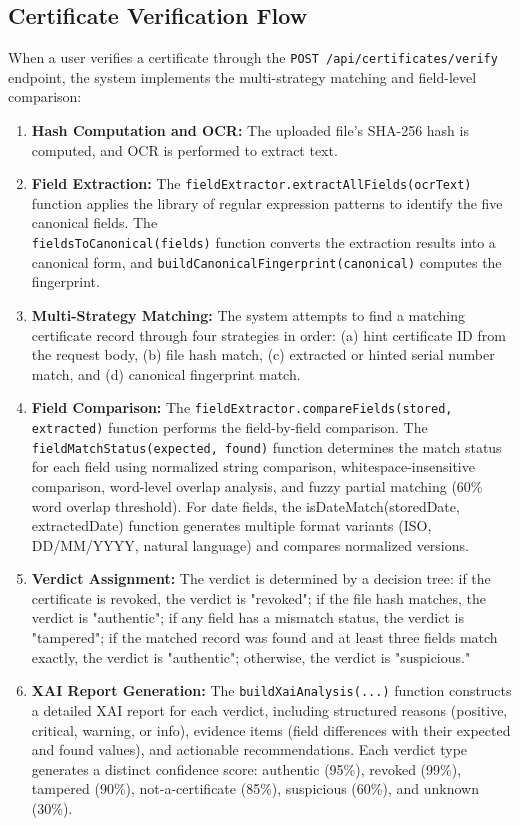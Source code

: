 \subsection{Certificate Verification Flow}

When a user verifies a certificate through the \texttt{POST /api/certificates/verify} endpoint, the system implements the multi-strategy matching and field-level comparison:

\begin{enumerate}
    \item \textbf{Hash Computation and OCR:} The uploaded file's SHA-256 hash is computed, and OCR is performed to extract text.
    \item \textbf{Field Extraction:} The \texttt{fieldExtractor.extractAllFields(ocrText)} function applies the library of regular expression patterns to identify the five canonical fields. The \\\texttt{fieldsToCanonical(fields)} function converts the extraction results into a canonical form, and \texttt{buildCanonicalFingerprint(canonical)} computes the fingerprint.
    \item \textbf{Multi-Strategy Matching:} The system attempts to find a matching certificate record through four strategies in order: (a) hint certificate ID from the request body, (b) file hash match, (c) extracted or hinted serial number match, and (d) canonical fingerprint match.
    \item \textbf{Field Comparison:} The \texttt{fieldExtractor.compareFields(stored, extracted)} function performs the field-by-field comparison. The \texttt{fieldMatchStatus(expected, found)} function determines the match status for each field using normalized string comparison, whitespace-insensitive comparison, word-level overlap analysis, and fuzzy partial matching (60\% word overlap threshold). For date fields, the {isDateMatch(storedDate, extractedDate)} function generates multiple format variants (ISO, DD/MM/YYYY, natural language) and compares normalized versions.
    \item \textbf{Verdict Assignment:} The verdict is determined by a decision tree: if the certificate is revoked, the verdict is "revoked"; if the file hash matches, the verdict is "authentic"; if any field has a mismatch status, the verdict is "tampered"; if the matched record was found and at least three fields match exactly, the verdict is "authentic"; otherwise, the verdict is "suspicious."
    \item \textbf{XAI Report Generation:} The \texttt{buildXaiAnalysis(...)} function constructs a detailed XAI report for each verdict, including structured reasons (positive, critical, warning, or info), evidence items (field differences with their expected and found values), and actionable recommendations. Each verdict type generates a distinct confidence score: authentic (95\%), revoked (99\%), tampered (90\%), not-a-certificate (85\%), suspicious (60\%), and unknown (30\%).

\end{enumerate}
